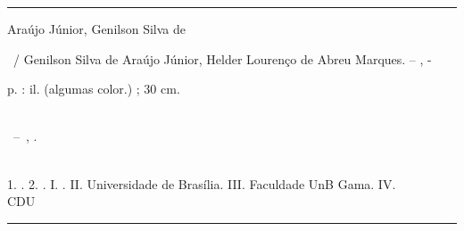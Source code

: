 \begin{fichacatalografica}
	\vspace*{\fill}					%
	\hrule							%
	\begin{center}					%
	\begin{minipage}[c]{12.5cm}		%

	Araújo Júnior, Genilson Silva de

	\hspace{0.5cm} \imprimirtitulo\ / Genilson Silva de Araújo Júnior,
	Helder Lourenço de Abreu Marques. -- \imprimirlocal, \imprimirdata-

	\hspace{0.5cm} \pageref{LastPage} p. : il. (algumas color.) ; 30 cm.\\

	\hspace{0.5cm} \imprimirorientadorRotulo~\imprimirorientador\\

	\hspace{0.5cm}
	\parbox[t]{\textwidth}{\imprimirtipotrabalho~--~\imprimirinstituicao,
	\imprimirdata.}\\

	\hspace{0.5cm}
		1. \imprimirpalavrachaveum.
		2. \imprimirpalavrachavedois.
		I. \imprimirorientador.
		II. Universidade de Brasília.
		III. Faculdade UnB Gama.
		IV. \imprimirtitulo\\

	\hspace{8.75cm} CDU \nomecdu\\

	\end{minipage}
	\end{center}
	\hrule
\end{fichacatalografica}
